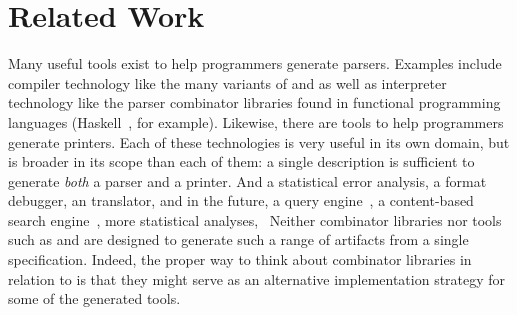 \section{Related Work}
\label{sec:related}

Many useful tools exist to help programmers generate parsers.
Examples include compiler technology like the many variants of
\lex{} and \yacc{} as well as interpreter technology like the parser
combinator libraries found in functional programming languages
(Haskell~\cite{hutton+:parser-combinators}, for example).  Likewise,
there are tools to help programmers generate printers.  Each of these
technologies is very useful in its own domain, but \padsml{} is
broader in its scope than each of them: a single \padsml{} description
is sufficient to generate \textit{both} a parser and a printer.  And a
statistical error analysis, a format debugger, an \xml{} translator,
and in the future, a query engine~\cite{fernandez+:padx}, a
content-based search engine~\cite{lv+:cbs,oh:siw}, more statistical
analyses, \etc\ Neither combinator libraries nor tools such as \lex{}
and \yacc{} are designed to generate such a range of artifacts from a
single specification.  Indeed, the proper way to think about
combinator libraries in relation to \padsml{} is that they might serve
as an alternative implementation strategy for some of the generated
tools.




